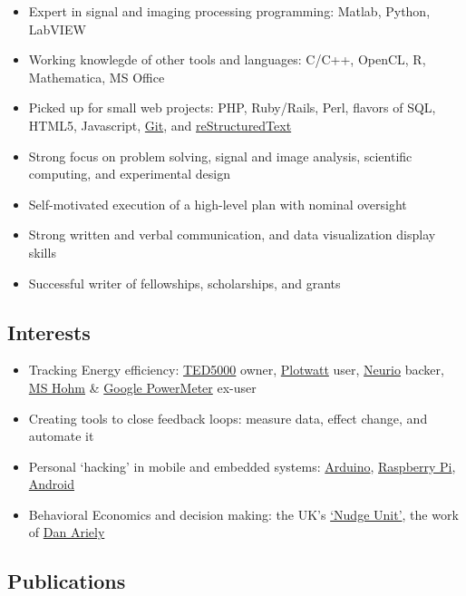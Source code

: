\documentclass[]{article}
\begin{document}
\begin{itemize}
\item
  Expert in signal and imaging processing programming: Matlab, Python,
  LabVIEW
\item
  Working knowlegde of other tools and languages: C/C++, OpenCL, R,
  Mathematica, MS Office
\item
  Picked up for small web projects: PHP, Ruby/Rails, Perl, flavors of
  SQL, HTML5, Javascript, \href{http://git-scm.com/}{Git}, and
  \href{http://docutils.sf.net/rst.html}{reStructuredText}
\item
  Strong focus on problem solving, signal and image analysis, scientific
  computing, and experimental design
\item
  Self-motivated execution of a high-level plan with nominal oversight
\item
  Strong written and verbal communication, and data visualization
  display skills
\item
  Successful writer of fellowships, scholarships, and grants
\end{itemize}
\subsection{Interests}

\begin{itemize}
\item
  Tracking Energy efficiency:
  \href{http://www.theenergydetective.com/}{TED5000} owner,
  \href{plotwatt.com}{Plotwatt} user, \href{https://neur.io/}{Neurio}
  backer, \href{en.wikipedia.org/wiki/Hohm}{MS Hohm} \&
  \href{google.com/powermeter/about/}{Google PowerMeter} ex-user
\item
  Creating tools to close feedback loops: measure data, effect change,
  and automate it
\item
  Personal `hacking' in mobile and embedded systems:
  \href{http://www.arduino.cc/}{Arduino},
  \href{http://www.raspberrypi.org/}{Raspberry Pi},
  \href{http://www.android.com/}{Android}
\item
  Behavioral Economics and decision making: the UK's
  \href{https://www.gov.uk/government/organisations/behavioural-insights-team}{`Nudge
  Unit'}, the work of \href{http://danariely.com/}{Dan Ariely}
\end{itemize}
\subsection{Publications}
\end{document}
